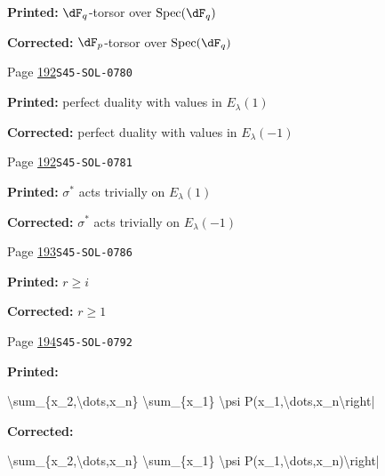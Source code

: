 \documentclass[oneside]{book}
\DeclareMathOperator{\spec}{Spec}
\theoremstyle{sga-source}
\theoremstyle{sga-source-dash}
\theoremstyle{sga-source-dotdash}
\theoremstyle{sga-source-number-note-dash}
\theoremstyle{sga-source-note-number-dotdash}
\theoremstyle{sga-source-example-dotdash}
\theoremstyle{sga-source-inline-number}
\theoremstyle{sga-source-bare-number}
\theoremstyle{sga-source}
\begin{document}
\begin{description}
\par\noindent\textbf{Printed:} $\dF_q$-torsor over $\spec(\dF_q)$
\par\noindent\textbf{Corrected:} $\dF_p$-torsor over $\spec(\dF_q)$
\smallskip
\item[\hypertarget{apparatus:EN-0121}{121}] Page \hyperlink{printpage:en:192}{192}\quad\texttt{S45-SOL-0780}
\par\noindent\textbf{Printed:} perfect duality with values in $E_\lambda(1)$
\par\noindent\textbf{Corrected:} perfect duality with values in $E_\lambda(-1)$
\smallskip
\item[\hypertarget{apparatus:EN-0122}{122}] Page \hyperlink{printpage:en:192}{192}\quad\texttt{S45-SOL-0781}
\par\noindent\textbf{Printed:} $\sigma^\ast$ acts trivially on $E_\lambda(1)$
\par\noindent\textbf{Corrected:} $\sigma^\ast$ acts trivially on $E_\lambda(-1)$
\smallskip
\item[\hypertarget{apparatus:EN-0123}{123}] Page \hyperlink{printpage:en:193}{193}\quad\texttt{S45-SOL-0786}
\par\noindent\textbf{Printed:} $r\geqslant i$
\par\noindent\textbf{Corrected:} $r\geqslant 1$
\smallskip
\item[\hypertarget{apparatus:EN-0124}{124}] Page \hyperlink{printpage:en:194}{194}\quad\texttt{S45-SOL-0792}
\par\noindent\textbf{Printed:} {\footnotesize\ttfamily\raggedright \textbackslash{}\allowbreak{}sum\_\allowbreak{}\{\allowbreak{}x\_\allowbreak{}2,\allowbreak{}\textbackslash{}\allowbreak{}dots,\allowbreak{}x\_\allowbreak{}n\}\allowbreak{} \textbackslash{}\allowbreak{}sum\_\allowbreak{}\{\allowbreak{}x\_\allowbreak{}1\}\allowbreak{} \textbackslash{}\allowbreak{}psi P(\allowbreak{}x\_\allowbreak{}1,\allowbreak{}\textbackslash{}\allowbreak{}dots,\allowbreak{}x\_\allowbreak{}n\textbackslash{}\allowbreak{}right|\par}
\par\noindent\textbf{Corrected:} {\footnotesize\ttfamily\raggedright \textbackslash{}\allowbreak{}sum\_\allowbreak{}\{\allowbreak{}x\_\allowbreak{}2,\allowbreak{}\textbackslash{}\allowbreak{}dots,\allowbreak{}x\_\allowbreak{}n\}\allowbreak{} \textbackslash{}\allowbreak{}sum\_\allowbreak{}\{\allowbreak{}x\_\allowbreak{}1\}\allowbreak{} \textbackslash{}\allowbreak{}psi P(\allowbreak{}x\_\allowbreak{}1,\allowbreak{}\textbackslash{}\allowbreak{}dots,\allowbreak{}x\_\allowbreak{}n)\allowbreak{}\textbackslash{}\allowbreak{}right|\par}

\end{description}
\end{document}
